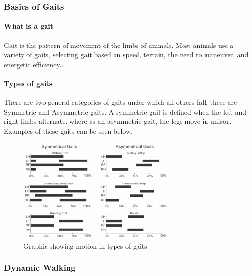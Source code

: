 \subsubsection{Basics of Gaits}
\paragraph{What is a gait}
Gait is the pattern of movement of the limbs of animals. Most animals use a variety of gaits, selecting gait based on speed, terrain, the need to maneuver, and energetic efficiency.\cite{wikipedia_2018_Gaits}.  

\paragraph{Types of gaits}
There are two general categories of gaits under which all others fall, these are Symmetric and Asymmetric gaits. A symmetric gait is defined when the left and right limbs alternate. where as an asymmetric gait, the legs move in unison. Examples of these gaits can be seen below.  
\begin{figure}[H]
    \centering
    \includegraphics[width=0.7\textwidth]{figures/Gait_graphs_v2.png}
    \caption{Graphic showing motion in types of gaits}
    \label{fig:my_label}
\end{figure}

\subsubsection{Dynamic Walking}

